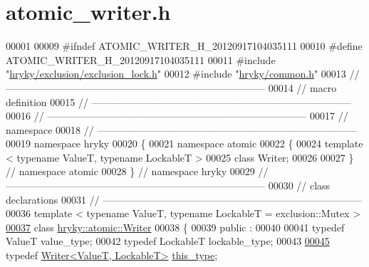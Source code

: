 \hypertarget{atomic__writer_8h_source}{\section{atomic\-\_\-writer.\-h}
}

\begin{DoxyCode}
00001 
00009 \textcolor{preprocessor}{#ifndef ATOMIC\_WRITER\_H\_20120917104035111}
00010 \textcolor{preprocessor}{}\textcolor{preprocessor}{#define ATOMIC\_WRITER\_H\_20120917104035111}
00011 \textcolor{preprocessor}{}\textcolor{preprocessor}{#include "\hyperlink{exclusion__lock_8h}{hryky/exclusion/exclusion_lock.h}"}
00012 \textcolor{preprocessor}{#include "\hyperlink{common_8h}{hryky/common.h}"}
00013 \textcolor{comment}{//
      ------------------------------------------------------------------------------}
00014 \textcolor{comment}{// macro definition}
00015 \textcolor{comment}{//
      ------------------------------------------------------------------------------}
00016 \textcolor{comment}{//
      ------------------------------------------------------------------------------}
00017 \textcolor{comment}{// namespace}
00018 \textcolor{comment}{//
      ------------------------------------------------------------------------------}
00019 \textcolor{keyword}{namespace }hryky
00020 \{
00021 \textcolor{keyword}{namespace }atomic
00022 \{
00024     \textcolor{keyword}{template} < \textcolor{keyword}{typename} ValueT, \textcolor{keyword}{typename} LockableT >
00025     \textcolor{keyword}{class }Writer;
00026     
00027 \} \textcolor{comment}{// namespace atomic}
00028 \} \textcolor{comment}{// namespace hryky}
00029 \textcolor{comment}{//
      ------------------------------------------------------------------------------}
00030 \textcolor{comment}{// class declarations}
00031 \textcolor{comment}{//
      ------------------------------------------------------------------------------}
00036 \textcolor{comment}{}\textcolor{keyword}{template} < \textcolor{keyword}{typename} ValueT, \textcolor{keyword}{typename} LockableT = exclusion::Mutex >
\hypertarget{atomic__writer_8h_source_l00037}{}\hyperlink{classhryky_1_1atomic_1_1_writer}{00037} \textcolor{keyword}{class }\hyperlink{classhryky_1_1atomic_1_1_writer}{hryky::atomic::Writer}
00038 \{
00039 \textcolor{keyword}{public} :
00040 
00041     \textcolor{keyword}{typedef} ValueT      value\_type;
00042     \textcolor{keyword}{typedef} LockableT   lockable\_type;
00043 
\hypertarget{atomic__writer_8h_source_l00045}{}\hyperlink{classhryky_1_1atomic_1_1_writer_a6b1cad65fb3ef1a993a5eb9e91450aea}{00045}     \textcolor{keyword}{typedef} \hyperlink{classhryky_1_1atomic_1_1_writer}{Writer<ValueT, LockableT>} \hyperlink{classhryky_1_1atomic_1_1_writer_a6b1cad65fb3ef1a993a5eb9e91450aea}{this_type};

\end{DoxyCode}

